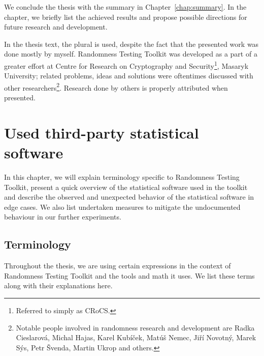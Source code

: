 \documentclass[
  digital,  	%
  color,		%
  oneside,   	%
  12pt,
  nocover,
  notable,
  nolof,
  nolot,
]{fithesis3}
\theoremstyle{definition}
\theoremstyle{remark}
\begin{document}
We conclude the thesis with the summary in Chapter~\ref{chap:summary}. In the chapter, we briefly list the achieved results and propose possible directions for future research and development.

In the thesis text, the plural is used, despite the fact that the presented work was done mostly by myself. Randomness Testing Toolkit was developed as a part of a greater effort at Centre for Research on Cryptography and Security\footnote{Referred to simply as CRoCS.}, Masaryk University; related problems, ideas and solutions were oftentimes discussed with other researchers\footnote{Notable people involved in randomness research and development are Radka Cieslarová, Michal Hajas, Karel Kubíček, Matúš Nemec, Jiří Novotný, Marek Sýs, Petr Švenda, Martin Ukrop and others.}. Research done by others is properly attributed when presented.

\chapter{Used third-party statistical software}
\label{chap:batteries}
In this chapter, we will explain terminology specific to Randomness Testing Toolkit, present a quick overview of the statistical software used in the toolkit and describe the observed and unexpected behavior of the statistical software in edge cases. We also list undertaken measures to mitigate the undocumented behaviour in our further experiments.

\section{Terminology}
\label{sec:terminology}
Throughout the thesis, we are using certain expressions in the context of Randomness Testing Toolkit and the tools and math it uses. We list these terms along with their explanations here.
\end{document}
